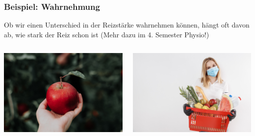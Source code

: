 \documentclass{beamer}
\begin{document}
\begin{frame}

\frametitle{Beispiel: Wahrnehmung}

Ob wir einen Unterschied in der Reizstärke wahrnehmen können, hängt oft davon ab, wie stark der Reiz schon ist (Mehr dazu im 4. Semester Physio!)




\begin{columns}[c]
\begin{column}{5cm}

\begin{center}
    \includegraphics[width=\textwidth]{priscilla-du-preez-CoqJGsFVJtM-unsplash.jpg}
        
\end{center}

    
\end{column}
\pause
\begin{column}{5cm}
\begin{center}

\includegraphics[width=\textwidth]{liuba-bilyk-wU_TbWqdPJI-unsplash.jpg}
\end{center}


\end{column}
\end{columns}
\end{frame}
\end{document}
